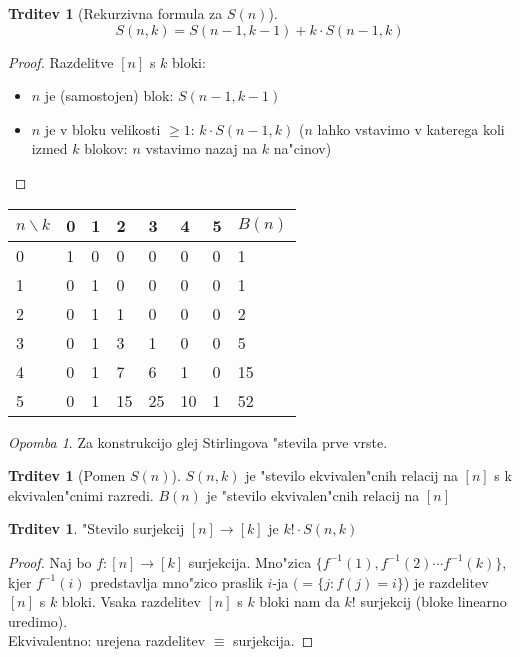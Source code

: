 \documentclass[a4paper,12pt]{article}
\theoremstyle{definition}
\newtheorem{claim}[counter]{Trditev}
\theoremstyle{remark}
\newtheorem*{rem}{Opomba}
\begin{document}
\begin{claim}[Rekurzivna formula za $S(n)$]
    \[S(n, k) = S(n-1, k-1) + k \cdot S(n-1, k)\] 
\end{claim}

\begin{proof}
    Razdelitve $[n]$ s $k$ bloki:
    \begin{itemize}
        \item $n$ je (samostojen) blok: $S(n-1, k-1)$
        \item $n$ je v bloku velikosti $\geq 1$: $k \cdot S(n-1, k)$ ($n$ lahko vstavimo v katerega koli izmed $k$ blokov: $n$ vstavimo nazaj na $k$ na"cinov)
    \end{itemize}
\end{proof}

\begin{center}
	\begin{tabular}{l|llllll|l}
	    $n \backslash k$ & 0 & 1  & 2  & 3  & 4  & 5 & $B(n)$ \\
	    \hline
	    0 & 1 & 0  & 0  & 0  & 0  & 0 & 1 \\
	    1 & 0 & 1  & 0  & 0  & 0  & 0 & 1 \\
	    2 & 0 & 1  & 1  & 0  & 0  & 0 & 2 \\
	    3 & 0 & 1  & 3  & 1  & 0  & 0 & 5 \\
	    4 & 0 & 1  & 7  & 6  & 1  & 0 & 15 \\
	    5 & 0 & 1  & 15 & 25 & 10 & 1 & 52
	\end{tabular}
\end{center}

\begin{rem}
	Za konstrukcijo glej Stirlingova "stevila prve vrste.
\end{rem}

\begin{claim}[Pomen $S(n)$]
    $S(n,k)$ je "stevilo ekvivalen"cnih relacij na $[n]$ s k ekvivalen"cnimi razredi. $B(n)$ je "stevilo ekvivalen"cnih relacij na $[n]$
\end{claim}

\begin{claim}
    "Stevilo surjekcij $[n] \rightarrow [k]$ je $k! \cdot S(n,k)$
\end{claim}

\begin{proof}
    Naj bo $f: [n] \rightarrow [k]$ surjekcija.
    Mno"zica $\{f^{-1}(1), f^{-1}(2) \cdots f^{-1}(k)\}$, kjer $f^{-1}(i)$ predstavlja mno"zico praslik $i$-ja $(=\{j: f(j) = i\}$) je razdelitev $[n]$ s $k$ bloki. Vsaka razdelitev $[n]$ s $k$ bloki nam da $k!$ surjekcij
    (bloke linearno uredimo).
    \\
    Ekvivalentno: urejena razdelitev $\equiv$ surjekcija.
\end{proof}
\end{document}
